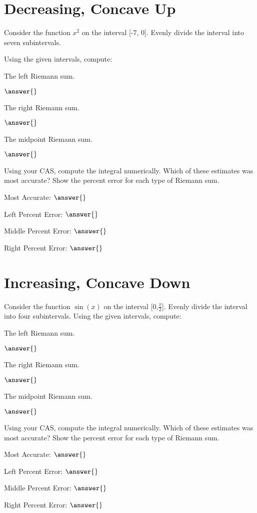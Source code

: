 \documentclass{ximera}
\begin{document}
\section{Decreasing, Concave Up}
\begin{question}
Consider the function $x^2$ on the interval [-7, 0]. Evenly divide the interval into seven subintervals.

Using the given intervals, compute:

The left Riemann sum.

$\answer{}$

The right Riemann sum.

$\answer{}$

The midpoint Riemann sum.

$\answer{}$

Using your CAS, compute the integral numerically. Which of these estimates was most accurate? Show the percent error for each type of Riemann sum.

Most Accurate: $\answer{}$

Left Percent Error: $\answer{}$

Middle Percent Error: $\answer{}$

Right Percent Error: $\answer{}$
\end{question}

\section{Increasing, Concave Down}
\begin{question}
Consider the function $\sin(x)$ on the interval [0,$\frac{\pi}{2}$]. Evenly divide the interval into four subintervals.
Using the given intervals, compute:

The left Riemann sum.

$\answer{}$

The right Riemann sum.

$\answer{}$

The midpoint Riemann sum.

$\answer{}$

Using your CAS, compute the integral numerically. Which of these estimates was most accurate? Show the percent error for each type of Riemann sum.

Most Accurate: $\answer{}$

Left Percent Error: $\answer{}$

Middle Percent Error: $\answer{}$

Right Percent Error: $\answer{}$
\end{question}
\end{document}
